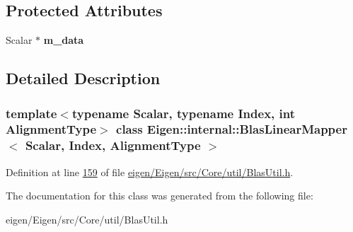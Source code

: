 \subsection*{Protected Attributes}
\begin{DoxyCompactItemize}
\item 
\mbox{\label{class_eigen_1_1internal_1_1_blas_linear_mapper_ae85740d2884e229eae59673a053cbced}} 
Scalar $\ast$ {\bfseries m\+\_\+data}
\end{DoxyCompactItemize}


\subsection{Detailed Description}
\subsubsection*{template$<$typename Scalar, typename Index, int Alignment\+Type$>$\newline
class Eigen\+::internal\+::\+Blas\+Linear\+Mapper$<$ Scalar, Index, Alignment\+Type $>$}



Definition at line \hyperlink{eigen_2_eigen_2src_2_core_2util_2_blas_util_8h_source_l00159}{159} of file \hyperlink{eigen_2_eigen_2src_2_core_2util_2_blas_util_8h_source}{eigen/\+Eigen/src/\+Core/util/\+Blas\+Util.\+h}.



The documentation for this class was generated from the following file\+:\begin{DoxyCompactItemize}
\item 
eigen/\+Eigen/src/\+Core/util/\+Blas\+Util.\+h\end{DoxyCompactItemize}
